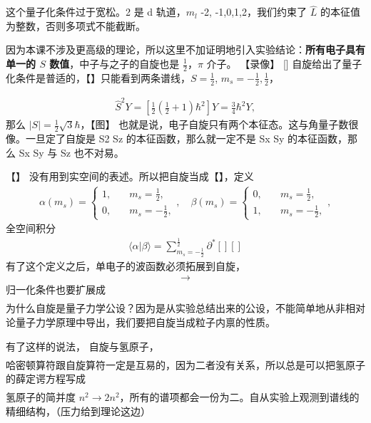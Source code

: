这个量子化条件过于宽松。2 是 d 轨道，$m_l$ -2, -1,0,1,2，我们约束了 $\hat L$ 的本征值为整数，否则多项式不能截断。

因为本课不涉及更高级的理论，所以这里不加证明地引入实验结论：\textbf{所有电子具有单一的 $S$ 数值}，中子与之子的自旋也是 $\frac12$，$\pi$ 介子。
【录像】
[]
自旋给出了量子化条件是普适的，【】只能看到两条谱线，$S = \frac12$, $m_s = -\frac12, \frac12$，

\begin{align}
    \hat S^2 Y = \left[\frac12\left(\frac12 + 1\right)\hbar^2\right] Y  = \frac34 \hbar^2 Y,
\end{align}
那么 $|S| = \frac12 \sqrt3 \hbar$，【图】
也就是说，电子自旋只有两个本征态。这与角量子数很像。一旦定了自旋是 S2 Sz 的本征函数，那么就一定不是 Sx Sy 的本征函数，那么 Sx Sy 与 Sz 也不对易。

【】
没有用到实空间的表述。所以把自旋当成【】，定义
\begin{align}
    \alpha(m_s) = \begin{cases}
        1, \quad & m_s = \frac12, \\
        0, \quad & m_s = -\frac12, 
    \end{cases}, \quad 
    \beta(m_s) = \begin{cases}
        0, \quad & m_s = \frac12, \\
        1, \quad & m_s = -\frac12, 
    \end{cases},  
\end{align}
全空间积分
\begin{align}
\langle \alpha | \beta \rangle = \sum_{m_s = -\frac12}^{\frac12} \partial ^* [][]
\end{align}
有了这个定义之后，单电子的波函数必须拓展到自旋，
\begin{align}
    [] \rightarrow
\end{align}
归一化条件也要扩展成
\begin{align}
    [][]
\end{align}
为什么自旋是量子力学公设？因为是从实验总结出来的公设，不能简单地从非相对论量子力学原理中导出，我们要把自旋当成粒子内禀的性质。

有了这样的说法，
自旋与氢原子，
\begin{align}
    []
\end{align}
哈密顿算符跟自旋算符一定是互易的，因为二者没有关系，所以总是可以把氢原子的薛定谔方程写成
\begin{align}
    []
\end{align}
氢原子的简并度 $n^2 \rightarrow 2n^2$，所有的谱项都会一份为二。自从实验上观测到谱线的精细结构，（压力给到理论这边）

